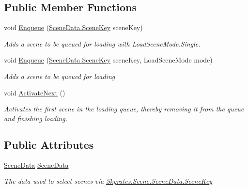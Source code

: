 \subsection*{Public Member Functions}
\begin{DoxyCompactItemize}
\item 
void \hyperlink{class_skyrates_1_1_scene_1_1_scene_loader_a966442d58fd93358a3529ef4f8df5dda}{Enqueue} (\hyperlink{class_skyrates_1_1_scene_1_1_scene_data_a466c9423ed3d053f5513e19abcf76b75}{Scene\-Data.\-Scene\-Key} scene\-Key)
\begin{DoxyCompactList}\small\item\em Adds a scene to be queued for loading with Load\-Scene\-Mode.\-Single. \end{DoxyCompactList}\item 
void \hyperlink{class_skyrates_1_1_scene_1_1_scene_loader_acd0d799033788b1b300f80d19f6eb37e}{Enqueue} (\hyperlink{class_skyrates_1_1_scene_1_1_scene_data_a466c9423ed3d053f5513e19abcf76b75}{Scene\-Data.\-Scene\-Key} scene\-Key, Load\-Scene\-Mode mode)
\begin{DoxyCompactList}\small\item\em Adds a scene to be queued for loading \end{DoxyCompactList}\item 
void \hyperlink{class_skyrates_1_1_scene_1_1_scene_loader_af3b4146253b703862df9c4c40a714a2f}{Activate\-Next} ()
\begin{DoxyCompactList}\small\item\em Activates the first scene in the loading queue, thereby removing it from the queue and finishing loading. \end{DoxyCompactList}\end{DoxyCompactItemize}
\subsection*{Public Attributes}
\begin{DoxyCompactItemize}
\item 
\hyperlink{class_skyrates_1_1_scene_1_1_scene_data}{Scene\-Data} \hyperlink{class_skyrates_1_1_scene_1_1_scene_loader_aa189bbb8762d4dcabc228062f968c76f}{Scene\-Data}
\begin{DoxyCompactList}\small\item\em The data used to select scenes via \hyperlink{class_skyrates_1_1_scene_1_1_scene_data_a466c9423ed3d053f5513e19abcf76b75}{Skyrates.\-Scene.\-Scene\-Data.\-Scene\-Key} \end{DoxyCompactList}\end{DoxyCompactItemize}
